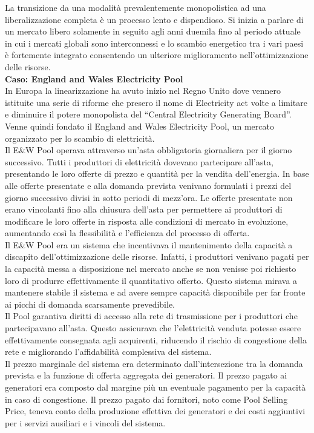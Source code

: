 \documentclass{article}
\begin{document}
La transizione da una modalità prevalentemente monopolistica ad una liberalizzazione completa è un processo lento e dispendioso. Si inizia a parlare di un mercato libero solamente in seguito agli anni duemila fino al periodo attuale in cui i mercati globali sono interconnessi e lo scambio energetico tra i vari paesi è fortemente integrato consentendo un ulteriore miglioramento nell’ottimizzazione delle risorse.\\
\textbf{Caso: England and Wales Electricity Pool}\\
In Europa la linearizzazione ha avuto inizio nel Regno Unito dove vennero istituite una serie di riforme che presero il nome di Electricity act volte a limitare e diminuire il potere monopolista del “Central Electricity Generating Board”. Venne quindi fondato il England and Wales Electricity Pool, un mercato organizzato per lo scambio di elettricità.\\
Il E\&W Pool operava attraverso un'asta obbligatoria giornaliera per il giorno successivo. Tutti i produttori di elettricità dovevano partecipare all’asta, presentando le loro offerte di prezzo e quantità per la vendita dell'energia. In base alle offerte presentate e alla domanda prevista venivano formulati i prezzi del giorno successivo divisi in sotto periodi di mezz’ora. Le offerte presentate non erano vincolanti fino alla chiusura dell'asta per permettere ai produttori di modificare le loro offerte in risposta alle condizioni di mercato in evoluzione, aumentando così la flessibilità e l'efficienza del processo di offerta.\\
Il E\&W Pool era un sistema che incentivava il mantenimento della capacità a discapito dell’ottimizzazione delle risorse. Infatti, i produttori venivano pagati per la capacità messa a disposizione nel mercato anche se non venisse poi richiesto loro di produrre effettivamente il quantitativo offerto. Questo sistema mirava a mantenere stabile il sistema e ad avere sempre capacità disponibile per far fronte ai picchi di domanda scarsamente prevedibile.\\
Il Pool garantiva diritti di accesso alla rete di trasmissione per i produttori che partecipavano all'asta. Questo assicurava che l'elettricità venduta potesse essere effettivamente consegnata agli acquirenti, riducendo il rischio di congestione della rete e migliorando l'affidabilità complessiva del sistema.\\
Il prezzo marginale del sistema era determinato dall'intersezione tra la domanda prevista e la funzione di offerta aggregata dei generatori. Il prezzo pagato ai generatori era composto dal margine più un eventuale pagamento per la capacità in caso di congestione. Il prezzo pagato dai fornitori, noto come Pool Selling Price, teneva conto della produzione effettiva dei generatori e dei costi aggiuntivi per i servizi ausiliari e i vincoli del sistema.\\
\end{document}

